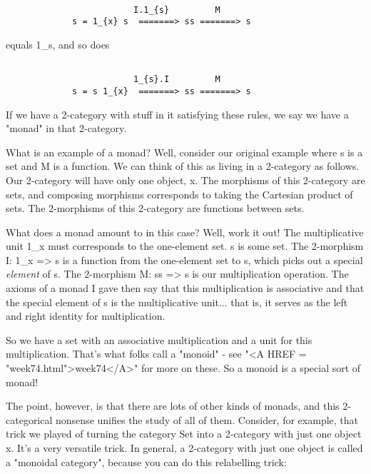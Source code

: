 \begin{verbatim}

                         I.1_{s}         M
             s = 1_{x} s  =======> ss =======> s

\end{verbatim}
    
equals 1_{s}, and so does


\begin{verbatim}

                         1_{s}.I         M
             s = s 1_{x}  =======> ss =======> s

\end{verbatim}
    
If we have a 2-category with stuff in it satisfying these rules, 
we say we have a "monad" in that 2-category.

What is an example of a monad?  Well, consider our original example
where s is a set and M is a function.  We can think of this as living in
a 2-category as follows.  Our 2-category will have only one object, x.
The morphisms of this 2-category are sets, and composing morphisms
corresponds to taking the Cartesian product of sets.  The 2-morphisms
of this 2-category are functions between sets.  

What does a monad amount to in this case?  Well, work it out!  The
multiplicative unit 1_{x} must corresponds to the one-element set.  s is
some set.  The 2-morphism I: 1_{x} => s is a function from the one-element
set to s, which picks out a special \emph{element} of s.  The 2-morphism 
M: ss => s is our multiplication operation.  The axioms of a monad I
gave then say that this multiplication is associative and that the
special element of s is the multiplicative unit... that is, it serves as
the left and right identity for multiplication.  

So we have a set with an associative multiplication and a unit for this
multiplication.  That's what folks call a "monoid" - see "<A HREF = "week74.html">week74</A>"
for more on these.  So a monoid is a special sort of monad!

The point, however, is that there are lots of other kinds of monads, and
this 2-categorical nonsense unifies the study of all of them.  Consider,
for example, that trick we played of turning the category Set into a
2-category with just one object x.  It's a very versatile trick.  In
general, a 2-category with just one object is called a "monoidal
category", because you can do this relabelling trick:


